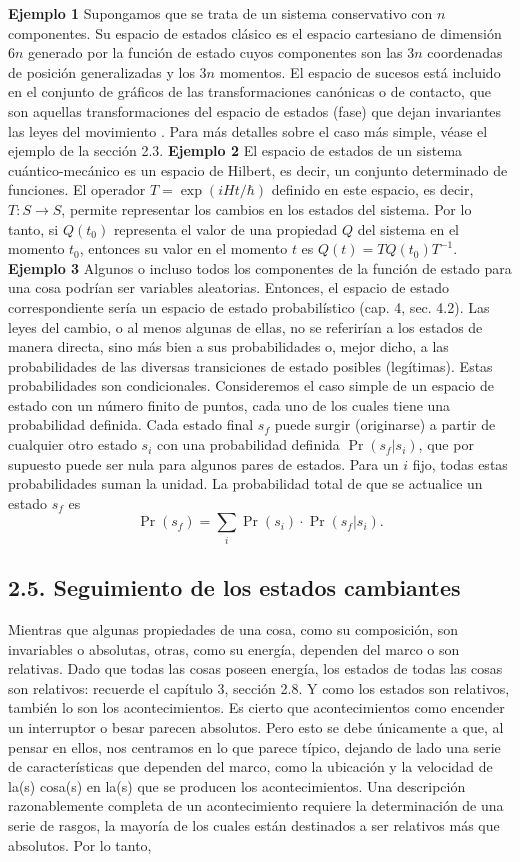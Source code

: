 \begin{justifying}
    \textbf{Ejemplo 1} Supongamos que se trata de un sistema conservativo con $n$ componentes.  Su espacio de estados clásico es el espacio cartesiano de dimensión $6n$ generado por     la función de estado cuyos componentes son las $3n$ coordenadas de posición generalizadas   y los $3n$ momentos. El espacio de sucesos está incluido en el conjunto de   gráficos de las transformaciones canónicas o de contacto, que son aquellas   transformaciones del espacio de estados (fase) que dejan invariantes las leyes del movimiento . Para más detalles sobre el caso más simple, véase el ejemplo de la sección 2.3.
    \textbf{Ejemplo 2} El espacio de estados de un sistema cuántico-mecánico es un espacio de Hilbert, es decir, un conjunto determinado de funciones. El operador $T = \exp(iHt/\hbar)$ definido en este espacio, es decir, $T: S \to S$, permite representar los cambios en los estados del sistema. Por lo tanto, si $Q(t_0)$ representa el valor de una propiedad $Q$    del sistema en el momento $t_0$, entonces su valor en el momento $t$ es $Q(t) = TQ(t_0)T^   {-1}$.
    \textbf{Ejemplo 3} Algunos o incluso todos los componentes de la función de estado  para una cosa podrían ser variables aleatorias. Entonces, el espacio de estado correspondiente   sería un espacio de estado probabilístico (cap. 4, sec. 4.2). Las leyes del cambio, o  al menos algunas de ellas, no se referirían a los estados de manera directa, sino   más bien a sus probabilidades o, mejor dicho, a las probabilidades de las diversas  transiciones de estado posibles (legítimas). Estas probabilidades son condicionales.  Consideremos el caso simple de un espacio de estado con un número finito de puntos, cada uno de los cuales tiene una probabilidad definida. Cada estado final $s_f$ puede surgir (originarse) a partir de cualquier otro estado $s_i$ con una probabilidad definida $\Pr(s_f|s_i)$, que por supuesto puede ser nula para algunos pares de estados. Para un $i$ fijo, todas estas probabilidades suman la unidad. La probabilidad total de que se actualice un estado $s_f$ es
  \[
  \Pr(s_f) = \sum_i \Pr(s_i) \cdot \Pr(s_f|s_i).
  \]

  \subsection*{2.5. Seguimiento de los estados cambiantes}
  Mientras que algunas propiedades de una cosa, como su composición, son invariables o absolutas, otras, como su energía, dependen del marco o son relativas. Dado que todas las cosas poseen energía, los estados de todas las cosas son relativos: recuerde el capítulo 3, sección 2.8. Y como los estados son relativos, también lo son los acontecimientos. Es cierto que acontecimientos como encender un interruptor o besar parecen absolutos. Pero esto se debe únicamente a que, al pensar en ellos, nos centramos en lo que parece típico, dejando de lado una serie de características que dependen del marco, como la ubicación y la velocidad de la(s) cosa(s) en la(s) que se producen los acontecimientos. Una descripción razonablemente completa de un acontecimiento requiere la determinación de una serie de rasgos, la mayoría de los cuales están destinados a ser relativos más que absolutos. Por lo tanto,


\end{justifying}
